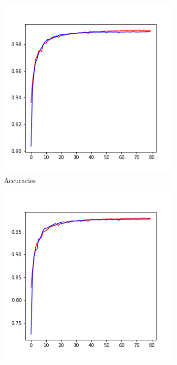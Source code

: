 \documentclass[10pt,conference,compsocconf]{IEEEtran}
\begin{document}
\begin{figure}[ht]
    \centering
    \begin{subfigure}{0.31\linewidth}
        \centering
        \includegraphics[width=\linewidth]{doc/images/opt_accuracies.png}
        \caption{Accuracies}
    \end{subfigure}
    \begin{subfigure}{0.31\linewidth}
        \centering
        \includegraphics[width=\linewidth]{doc/images/opt_f1_scores.png}

\end{subfigure}
\end{figure}
\end{document}

